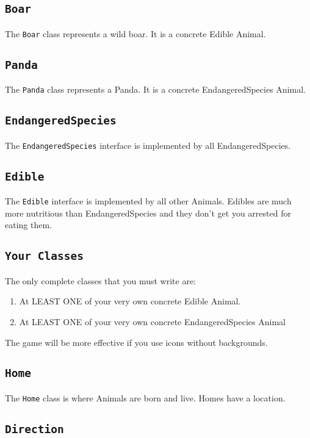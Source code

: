 \documentclass[12pt]{article}
\begin{document}
\subsection{{\tt Boar}}

The {\tt Boar} class represents a wild boar.  It is a concrete Edible Animal.


\subsection{{\tt Panda}}

The {\tt Panda} class represents a Panda.  It is a concrete EndangeredSpecies Animal.

\subsection{{\tt EndangeredSpecies}}

The {\tt EndangeredSpecies} interface is implemented by all EndangeredSpecies.

\subsection{{\tt Edible}}

The {\tt Edible} interface is implemented by all other Animals.  Edibles are much more nutritious than EndangeredSpecies and they don't get you arrested for eating them.


\subsection{{\tt Your Classes}}

The only complete classes that you must write are:
\begin{enumerate}
    \item At LEAST ONE of your very own concrete Edible Animal.
    \item At LEAST ONE of your very own concrete EndangeredSpecies Animal
    \end{enumerate}
The game will be more effective if you use icons without backgrounds.  

\subsection{{\tt Home}}

The {\tt Home} class is where Animals are born and live.  Homes have a location.

\subsection{{\tt Direction}}
\end{document}

